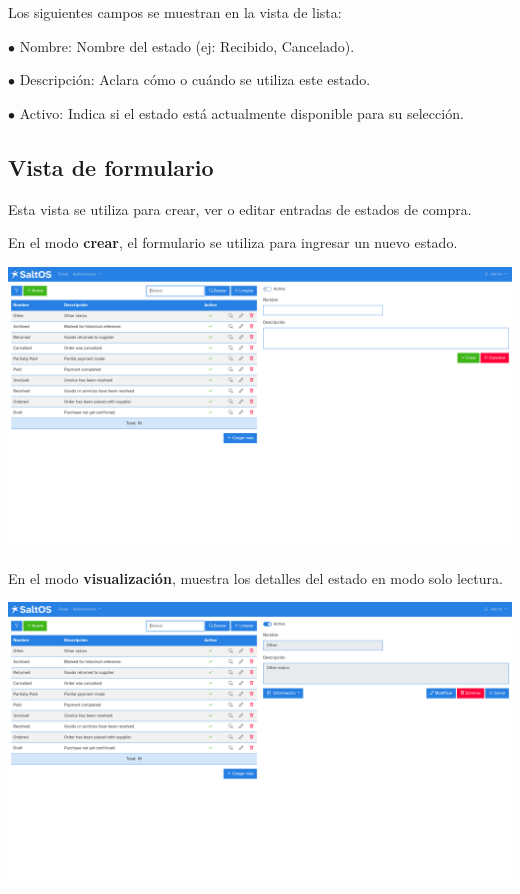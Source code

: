 \documentclass[a4paper]{article}
\begin{document}
Los siguientes campos se muestran en la vista de lista:

\begin{compactitem}
\item[\color{myblue}$\bullet$] Nombre: Nombre del estado (ej: Recibido, Cancelado).
\item[\color{myblue}$\bullet$] Descripción: Aclara cómo o cuándo se utiliza este estado.
\item[\color{myblue}$\bullet$] Activo: Indica si el estado está actualmente disponible para su selección.
\end{compactitem}

\hypertarget{toc124}{}
\subsection{Vista de formulario}

Esta vista se utiliza para crear, ver o editar entradas de estados de compra.

En el modo \textbf{crear}, el formulario se utiliza para ingresar un nuevo estado.

\begin{center}\includegraphics[width=1\textwidth]{../ujest/snaps/test-screenshots-js-screenshots-purchases-purchase-status-create-es-es-1-snap.png}\end{center}

En el modo \textbf{visualización}, muestra los detalles del estado en modo solo lectura.

\begin{center}\includegraphics[width=1\textwidth]{../ujest/snaps/test-screenshots-js-screenshots-purchases-purchase-status-view-10-es-es-1-snap.png}\end{center}
\end{document}
